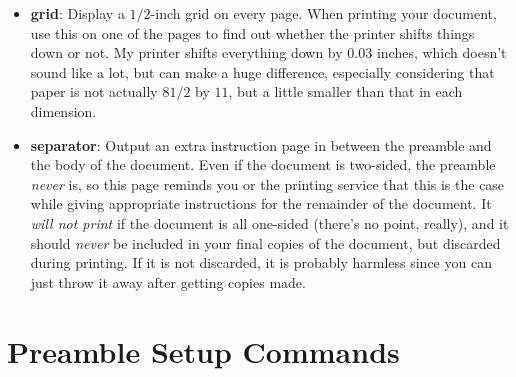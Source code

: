 \documentclass[phd,electronic,letterpaper,chaptercenter,parttop]{byumsphd}
\begin{document}
\begin{itemize}
\begin{itemize}
            \item \textbf{grid}: Display a \( 1/2 \)-inch grid on every page.  When printing your document, use this on one of the pages to find out whether the printer shifts things down or not.  My printer shifts everything down by \( 0.03 \) inches, which doesn't sound like a lot, but can make a huge difference, especially considering that paper is not actually \( 8 1/2 \) by \( 11 \), but a little smaller than that in each dimension.
            \item \textbf{separator}: Output an extra instruction page in between the preamble and the body of the document.  Even if the document is two-sided, the preamble \emph{never} is, so this page reminds you or the printing service that this is the case while giving appropriate instructions for the remainder of the document.  It \emph{will not print} if the document is all one-sided (there's no point, really), and it should \emph{never} be included in your final copies of the document, but discarded during printing.  If it is not discarded, it is probably harmless since you can just throw it away after getting copies made.
        \end{itemize}
\end{itemize}

\section{Preamble Setup Commands}
\end{document}
